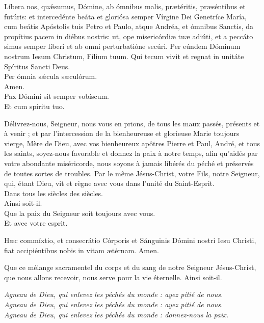\documentclass[twoside]{article}
\begin{document}
\begin{paracol}{2}
\switchcolumn*

Líbera nos, quǽsumus, Dómine, ab ómnibus malis, prætéritis, præséntibus et futúris: et intercedénte beáta et gloriósa semper Vírgine Dei Genetríce María, cum beátis Apóstolis tuis Petro et Paulo, atque Andréa, et ómnibus Sanctis, da propítius pacem in diébus nostris: ut, ope misericórdiæ tuæ adiúti, et a peccáto simus semper líberi et ab omni perturbatióne secúri.
Per eúndem Dóminum nostrum Iesum Christum, Fílium tuum.
Qui tecum vivit et regnat in unitáte Spíritus Sancti Deus.\\
\vv Per ómnia sǽcula sæculórum.\\
\rr Amen.\\
\vv Pax Dómini sit semper vobíscum.\\
\rr Et cum spíritu tuo.

\switchcolumn

Délivrez-nous, Seigneur, nous vous en prions, de tous les maux passés, présents et à venir ; et par l’intercession de la bienheureuse et glorieuse Marie toujours vierge, Mère de Dieu, avec vos bienheureux apôtres Pierre et Paul, André, et tous les saints, soyez-nous favorable et donnez la paix à notre temps, aﬁn qu’aidés par votre abondante miséricorde, nous soyons à jamais libérés du péché et préservés de toutes sortes de troubles.
Par le même Jésus-Christ, votre Fils, notre Seigneur,
qui, étant Dieu, vit et règne avec vous dans l’unité du Saint-Esprit.\\
\vv Dans tous les siècles des siècles.\\
\rr Ainsi soit-il.\\
\vv Que la paix du Seigneur soit toujours avec vous.\\
\rr Et avec votre esprit.

\switchcolumn*

Hæc commíxtio, et consecrátio Córporis et Sánguinis Dómini nostri Iesu Christi, fiat accipiéntibus nobis in vitam ætérnam. Amen.

\switchcolumn

Que ce mélange sacramentel du corps et du sang de notre Seigneur Jésus-Christ, que nous allons recevoir, nous serve pour la vie éternelle. Ainsi soit-il.

\end{paracol}


\emph{Agneau de Dieu, qui enlevez les péchés du monde : ayez pitié de nous.\\
Agneau de Dieu, qui enlevez les péchés du monde : ayez pitié de nous.\\
Agneau de Dieu, qui enlevez les péchés du monde : donnez-nous la paix.}
\end{document}
